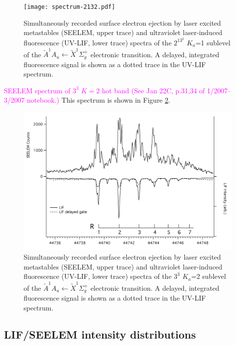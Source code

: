\documentclass[12pt]{mitthesis}
\newcommand{\POINT}[1]{\textcolor{magenta}{#1}}
\begin{document}
\begin{figure}
  \caption{
    Simultaneously recorded surface electron ejection by laser excited
    metastables (SEELEM, upper trace) and ultraviolet laser-induced
    fluorescence (UV-LIF, lower trace) spectra of the $2^13^2$ $K_a$=1
    sublevel of the $\tilde{A}^1A_u \leftarrow \tilde{X} ^1\Sigma_g^+$
    electronic transition. A delayed, integrated fluorescence signal
    is shown as a dotted trace in the UV-LIF spectrum.}
  \label{fig:spectrum-2132}
  \centering
  \texttt{[image: spectrum-2132.pdf]}
\end{figure}


\POINT{SEELEM spectrum of $3^3$ $K=2$ hot band (See Jan 22C, p.31,34
  of 1/2007--3/2007 notebook.)}  This spectrum is shown in Figure
\ref{fig:spectrum-33k2}.

\begin{figure}
  \caption{
    Simultaneously recorded surface electron ejection by laser excited
    metastables (SEELEM, upper trace) and ultraviolet laser-induced
    fluorescence (UV-LIF, lower trace) spectra of the $3^3$ $K_a$=2
    sublevel of the $\tilde{A}^1A_u \leftarrow \tilde{X} ^1\Sigma_g^+$
    electronic transition. A delayed, integrated fluorescence signal
    is shown as a dotted trace in the UV-LIF spectrum.}
  \label{fig:spectrum-33k2}
  \centering
  \includegraphics[width=8in,angle=90]{spectrum-33k2.png}
\end{figure}

\subsection{LIF/SEELEM intensity distributions}
\end{document}
